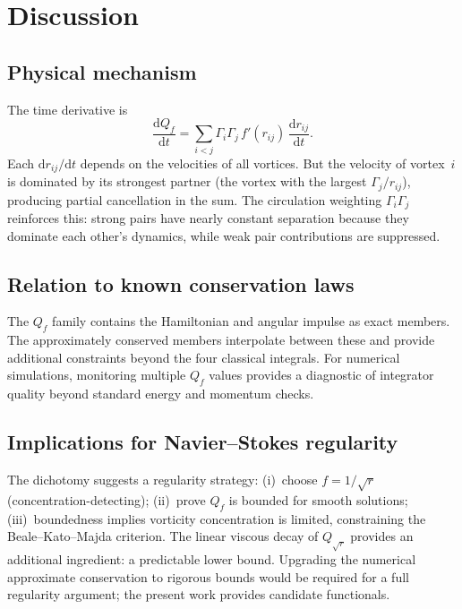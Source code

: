 \documentclass[rapids]{jfm}
\begin{document}
\section{Discussion}

\subsection{Physical mechanism}

The time derivative is
\begin{equation}
\frac{\mathrm{d}Q_f}{\mathrm{d}t} = \sum_{i<j} \Gamma_i \Gamma_j\, f'(r_{ij})\,\frac{\mathrm{d}r_{ij}}{\mathrm{d}t}.
\end{equation}
Each $\mathrm{d}r_{ij}/\mathrm{d}t$ depends on the velocities of all vortices. But the velocity of vortex~$i$ is dominated by its strongest partner (the vortex with the largest $\Gamma_j / r_{ij}$), producing partial cancellation in the sum. The circulation weighting $\Gamma_i \Gamma_j$ reinforces this: strong pairs have nearly constant separation because they dominate each other's dynamics, while weak pair contributions are suppressed.

\subsection{Relation to known conservation laws}

The $Q_f$ family contains the Hamiltonian and angular impulse as exact members. The approximately conserved members interpolate between these and provide additional constraints beyond the four classical integrals. For numerical simulations, monitoring multiple $Q_f$ values provides a diagnostic of integrator quality beyond standard energy and momentum checks.

\subsection{Implications for Navier--Stokes regularity}

The dichotomy suggests a regularity strategy: (i)~choose $f = 1/\sqrt{r}$ (concentration-detecting); (ii)~prove $Q_f$ is bounded for smooth solutions; (iii)~boundedness implies vorticity concentration is limited, constraining the Beale--Kato--Majda criterion. The linear viscous decay of $Q_{\sqrt{r}}$ provides an additional ingredient: a predictable lower bound. Upgrading the numerical approximate conservation to rigorous bounds would be required for a full regularity argument; the present work provides candidate functionals.
\end{document}
